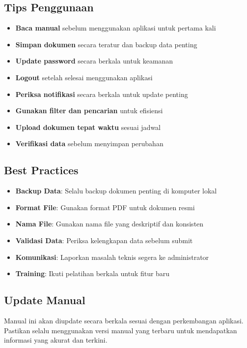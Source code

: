 \documentclass[12pt,a4paper]{article}
\begin{document}
\subsection{Tips Penggunaan}
\begin{itemize}
\item \textbf{Baca manual} sebelum menggunakan aplikasi untuk pertama kali
\item \textbf{Simpan dokumen} secara teratur dan backup data penting
\item \textbf{Update password} secara berkala untuk keamanan
\item \textbf{Logout} setelah selesai menggunakan aplikasi
\item \textbf{Periksa notifikasi} secara berkala untuk update penting
\item \textbf{Gunakan filter dan pencarian} untuk efisiensi
\item \textbf{Upload dokumen tepat waktu} sesuai jadwal
\item \textbf{Verifikasi data} sebelum menyimpan perubahan
\end{itemize}

\subsection{Best Practices}
\begin{itemize}
\item \textbf{Backup Data}: Selalu backup dokumen penting di komputer lokal
\item \textbf{Format File}: Gunakan format PDF untuk dokumen resmi
\item \textbf{Nama File}: Gunakan nama file yang deskriptif dan konsisten
\item \textbf{Validasi Data}: Periksa kelengkapan data sebelum submit
\item \textbf{Komunikasi}: Laporkan masalah teknis segera ke administrator
\item \textbf{Training}: Ikuti pelatihan berkala untuk fitur baru
\end{itemize}

\subsection{Update Manual}
Manual ini akan diupdate secara berkala sesuai dengan perkembangan aplikasi. Pastikan selalu menggunakan versi manual yang terbaru untuk mendapatkan informasi yang akurat dan terkini.

\appendix
\end{document}
